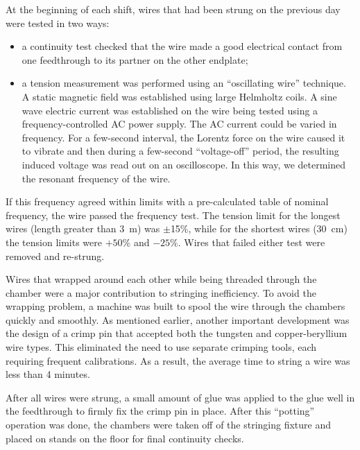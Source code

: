 At the beginning of each shift, wires that had been strung on the previous day
were tested in two ways:
\begin{itemize}
\item a continuity test checked that the wire made a good electrical contact
from one feedthrough to its partner on the other endplate;
\item a tension measurement was performed using an ``oscillating wire'' technique.
A static magnetic field was established using large Helmholtz coils.  A sine
wave electric current was established on the wire being tested using a frequency-controlled 
AC power supply.  The AC current could be varied in frequency.  For a 
few-second interval, the Lorentz force on the wire caused it to vibrate and
then during a few-second ``voltage-off'' period, the resulting induced voltage
was read out on an oscilloscope.  In this way, we determined the resonant frequency
of the wire. 
\end{itemize}

If this frequency agreed within limits with a pre-calculated table of nominal frequency, the
wire passed the frequency test.  The tension limit for the longest wires (length greater than
3~m) was $\pm$15\%, while for the shortest wires (30~cm) the tension limits were $+50\%$
and $-25\%$. Wires that failed either test were removed and re-strung.

Wires that wrapped around each other while being threaded through the chamber 
were a major contribution to stringing inefficiency. To avoid the wrapping
problem, a machine was built to spool the wire through the chambers quickly and smoothly.
As mentioned earlier, another important development was the design of a crimp pin 
that accepted both the tungsten and copper-beryllium wire types.    This 
eliminated the need to use separate crimping tools, each requiring frequent 
calibrations. As a result, the average time to string a wire was less than 4 minutes.

After all wires were strung, a small amount of glue was applied to the glue well
in the feedthrough to firmly fix the crimp pin in place.  After this ``potting''
operation was done, the chambers were taken off of the stringing fixture and
placed on stands on the floor for final continuity checks.








